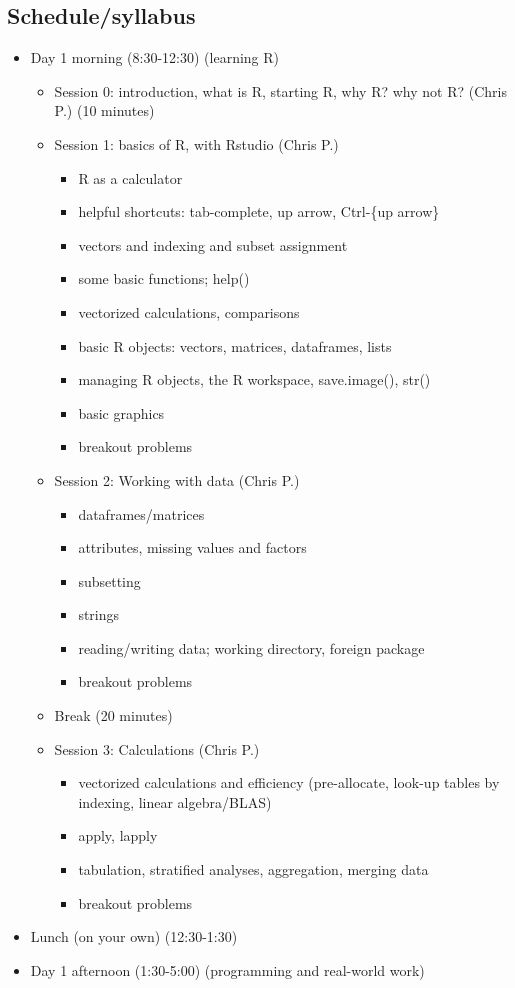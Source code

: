 \documentclass[12pt]{article}\usepackage{graphicx, color}
\begin{document}
\subsection*{Schedule/syllabus}
\begin{itemize}
\item Day 1 morning (8:30-12:30) (learning R)

\begin{itemize}
\item Session 0: introduction, what is R, starting R, why R? why not R?
(Chris P.) (10 minutes)
\item Session 1: basics of R, with Rstudio (Chris P.)

\begin{itemize}
\item R as a calculator
\item helpful shortcuts: tab-complete, up arrow, Ctrl-\{up arrow\}
\item vectors and indexing and subset assignment
\item some basic functions; help()
\item vectorized calculations, comparisons
\item basic R objects: vectors, matrices, dataframes, lists
\item managing R objects, the R workspace, save.image(), str()
\item basic graphics
\item breakout problems  
\end{itemize}
\item Session 2: Working with data (Chris P.)

\begin{itemize}
\item dataframes/matrices
\item attributes, missing values and factors
\item subsetting
\item strings
\item reading/writing data; working directory, foreign package
\item breakout problems 
\end{itemize}
\item Break (20 minutes)
\item Session 3: Calculations (Chris P.)

\begin{itemize}
\item vectorized calculations and efficiency (pre-allocate, look-up tables
by indexing, linear algebra/BLAS)
\item apply, lapply
\item tabulation, stratified analyses, aggregation, merging data
\item breakout problems 
\end{itemize}
\end{itemize}
\item Lunch (on your own) (12:30-1:30)
\item Day 1 afternoon (1:30-5:00) (programming and real-world work)


\end{itemize}
\end{document}

